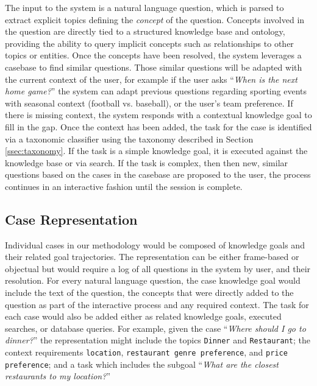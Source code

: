 \documentclass[11pt,letterpaper]{article}
\begin{document}
The input to the system is a natural language question, which is parsed to extract explicit topics defining the \textit{concept} of the question. Concepts involved in the question are directly tied to a structured knowledge base and ontology, providing the ability to query implicit concepts such as relationships to other topics or entities. Once the concepts have been resolved, the system leverages a casebase to find similar questions. Those similar questions will be adapted with the current context of the user, for example if the user asks ``\textit{When is the next home game?}'' the system can adapt previous questions regarding sporting events with seasonal context (football vs. baseball), or the user's team preference. If there is missing context, the system responds with a contextual knowledge goal to fill in the gap. Once the context has been added, the task for the case is identified via a taxonomic classifier using the taxonomy described in Section \ref{ssec:taxonomy}. If the task is a simple knowledge goal, it is executed against the knowledge base or via search. If the task is complex, then then new, similar questions based on the cases in the casebase are proposed to the user, the process continues in an interactive fashion until the session is complete.

\subsection{Case Representation}

Individual cases in our methodology would be composed of knowledge goals and their related goal trajectories. The representation can be either frame-based or objectual but would require a log of all questions in the system by user, and their resolution. For every natural language question, the case knowledge goal would include the text of the question, the concepts that were directly added to the question as part of the interactive process and any required context. The task for each case would also be added either as related knowledge goals, executed searches, or database queries. For example, given the case ``\textit{Where should I go to dinner?}'' the representation might include the topics \texttt{Dinner} and \texttt{Restaurant}; the context requirements \texttt{location}, \texttt{restaurant genre preference}, and \texttt{price preference}; and a task which includes the subgoal ``\textit{What are the closest restaurants to my location?}''
\end{document}
